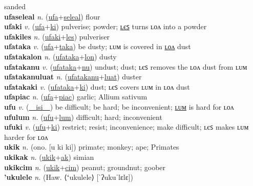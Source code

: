 sanded \label{ufalonsapulon} \\
\textbf{ufaseleal} \textit{n.} (\hyperref[ufa]{ufa}+\hyperref[seleal]{seleal})
flour \label{ufaseleal} \\
\textbf{ufaki} \textit{v.} (\hyperref[ufa]{ufa}+\hyperref[ki]{ki})
pulverise; powder; \hyperref[ufakiles]{ʟєꜱ} turns ʟᴏᴧ into a powder \label{ufaki} \\
\textbf{ufakiles} \textit{n.} (\hyperref[ufaki]{ufaki}+\hyperref[les]{les})
pulveriser \label{ufakiles} \\
\textbf{ufataka} \textit{v.} (\hyperref[ufa]{ufa}+\hyperref[taka]{taka})
be dusty; ʟᴜᴍ is covered in \hyperref[ufatakalon]{ʟᴏᴧ} dust \label{ufataka} \\
\textbf{ufatakalon} \textit{n.} (\hyperref[ufataka]{ufataka}+\hyperref[lon]{lon})
dusty \label{ufatakalon} \\
\textbf{ufatakanu} \textit{v.} (\hyperref[ufataka]{ufataka}+\hyperref[nu]{nu})
undust; dust; ʟєꜱ removes the ʟᴏᴧ dust from ʟᴜᴍ \label{ufatakanu} \\
\textbf{ufatakanuluat} \textit{n.} (\hyperref[ufatakanu]{ufatakanu}+\hyperref[luat]{luat})
duster \label{ufatakanuluat} \\
\textbf{ufatakaki} \textit{v.} (\hyperref[ufataka]{ufataka}+\hyperref[ki]{ki})
dust; ʟєꜱ covers ʟᴜᴍ in ʟᴏᴧ dust \label{ufatakaki} \\
\textbf{ufapiac} \textit{n.} (\hyperref[ufa]{ufa}+\hyperref[piac]{piac})
garlic; Allium sativum \label{ufapiac} \\
\textbf{ufu} \textit{v.} (\hyperref[isi]{~~isi~~})
be difficult; be hard; be inconvenient; \hyperref[ufulum]{ʟᴜᴍ} is hard for ʟᴏᴧ \label{ufu} \\
\textbf{ufulum} \textit{n.} (\hyperref[ufu]{ufu}+\hyperref[lum]{lum})
difficult; hard; inconvenient \label{ufulum} \\
\textbf{ufuki} \textit{v.} (\hyperref[ufu]{ufu}+\hyperref[ki]{ki})
restrict; resist; inconvenience; make difficult; ʟєꜱ makes ʟᴜᴍ harder for ʟᴏᴧ \label{ufuki} \\
\textbf{ukik} \textit{n.} (ono. [u ki ki])
primate; monkey; ape; Primates \label{ukik} \\
\textbf{ukikak} \textit{n.} (\hyperref[ukik]{ukik}+\hyperref[ak]{ak})
simian \label{ukikak} \\
\textbf{ukikcim} \textit{n.} (\hyperref[ukik]{ukik}+\hyperref[cim]{cim})
peanut; groundnut; goober \label{ukikcim} \\
\textbf{'ukulele} \textit{n.} (Haw. ⟨ʻukulele⟩ [ˈʔukuˈlɛlɛ])
